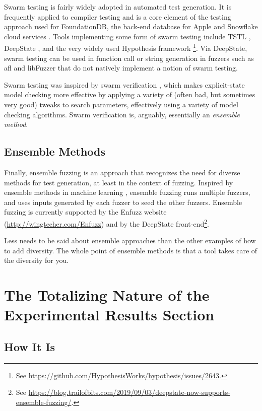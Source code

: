 \documentclass[sigplan,screen]{acmart}
\begin{document}
Swarm testing is fairly widely adopted in automated test generation.  It is frequently
applied to compiler testing \cite{le2014compiler,dewey2015fuzzing} and
is a core element of the testing approach used for FoundationDB, the
back-end database for Apple and Snowflake cloud services
\cite{zhou2021foundationdb}.  Tools implementing some form of swarm
testing include TSTL \cite{tstlsttt}, DeepState \cite{goodman2018deepstate}, and the very widely used Hypothesis
framework \cite{hypothesis}\footnote{See \url{https://github.com/HypothesisWorks/hypothesis/issues/2643}.}.
Via DeepState, swarm testing can be used in function call or
string generation in fuzzers such as afl and libFuzzer that do not
natively implement a notion of swarm testing.

Swarm testing was inspired by swarm verification \cite{swarmIEEE},
which makes explicit-state model checking more effective by applying a
variety of (often bad, but sometimes very good) tweaks to search
parameters, effectively using a variety of model checking algorithms.
Swarm verification is, arguably, essentially an \emph{ensemble method}.

\subsection{Ensemble Methods}

Finally, ensemble fuzzing \cite{chen2019enfuzz} is an approach that recognizes the need for
diverse methods for test generation, at least in the context of
fuzzing.   Inspired by ensemble methods in machine learning \cite{dietterich2002ensemble},
ensemble fuzzing runs multiple fuzzers, and uses inputs generated by
each fuzzer to seed the other fuzzers.  Ensemble fuzzing is currently
supported by the Enfuzz website  (\url{http://wingtecher.com/Enfuzz})
and by the DeepState front-end\footnote{See
\url{https://blog.trailofbits.com/2019/09/03/deepstate-now-supports-ensemble-fuzzing/}.}.

Less needs to be said about ensemble approaches than the other
examples of how to add diversity.  The whole point of ensemble methods
is that a tool takes care of the diversity for you.

\section{The Totalizing Nature of the Experimental Results Section}

\subsection{How It Is}
\end{document}

